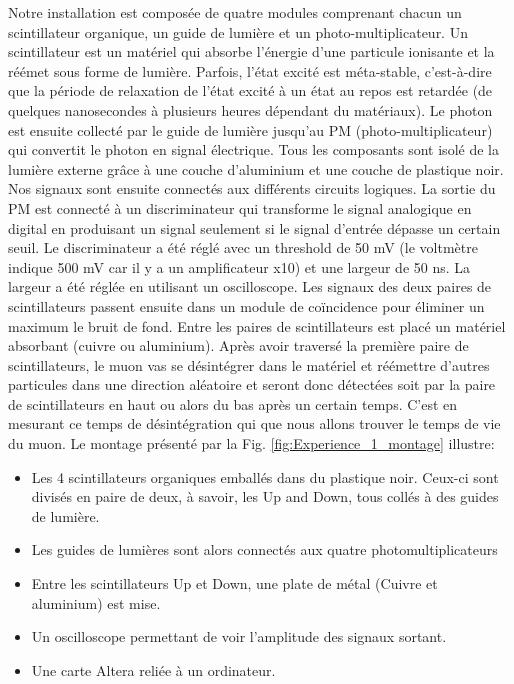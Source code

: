 \documentclass[12pt]{article}
\begin{document}
Notre installation est composée de quatre modules comprenant chacun un scintillateur organique, un guide de lumière et un photo-multiplicateur. Un scintillateur est un matériel qui absorbe l'énergie d'une particule ionisante et la réémet sous forme de lumière. Parfois, l'état excité est méta-stable, c'est-à-dire que la période de relaxation de l'état excité à un état au repos est retardée (de quelques nanosecondes à plusieurs heures dépendant du matériaux). Le photon est ensuite collecté par le guide de lumière jusqu'au PM (photo-multiplicateur) qui convertit le photon en signal électrique. Tous les composants sont isolé de la lumière externe grâce à une couche d'aluminium et une couche de plastique noir.
Nos signaux sont ensuite connectés aux différents circuits logiques. La sortie du PM est connecté à un discriminateur qui transforme le signal analogique en digital en produisant un signal seulement si le signal d'entrée dépasse un certain seuil. Le discriminateur a été réglé avec un threshold de 50 mV (le voltmètre indique 500 mV car il y a un amplificateur x10) et une largeur de 50 ns. La largeur a été réglée en utilisant un oscilloscope. Les signaux des deux paires de scintillateurs passent ensuite dans un module de coïncidence pour éliminer un maximum le bruit de fond.
Entre les paires de scintillateurs est placé un matériel absorbant (cuivre ou aluminium). Après avoir traversé la première paire de scintillateurs, le muon vas se désintégrer dans le matériel et réémettre d'autres particules dans une direction aléatoire et seront donc détectées soit par la paire de scintillateurs en haut ou alors du bas après un certain temps. C'est en mesurant ce temps de désintégration qui que nous allons trouver le temps de vie du muon. Le montage présenté par la Fig. \ref{fig:Experience_1_montage} illustre: 
\begin{itemize}
    \item   Les 4 scintillateurs organiques emballés dans du plastique noir. Ceux-ci sont divisés en paire de deux, à savoir, les Up and Down, tous collés à des guides de lumière. 
    \item Les guides de lumières sont alors connectés aux quatre photomultiplicateurs
    \item   Entre les scintillateurs Up et Down, une plate de métal (Cuivre et aluminium) est mise.
    \item   Un oscilloscope permettant de voir l'amplitude des signaux sortant.
    \item Une carte Altera reliée à un ordinateur.
\end{itemize}
\end{document}
